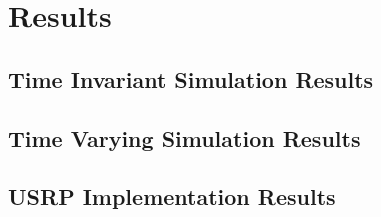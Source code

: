\chapter{Results}
\label{chap:Results}
\section{Time Invariant Simulation Results}


\section{Time Varying Simulation Results}


\section{USRP Implementation Results}


